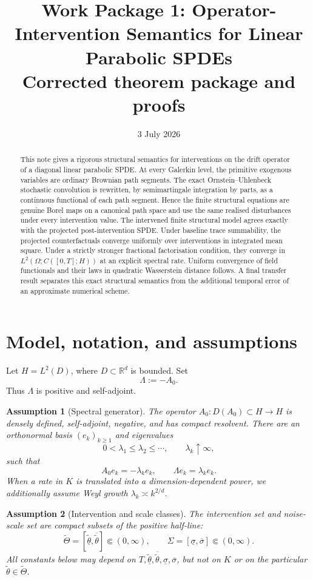\documentclass[11pt]{article}
\title{Work Package 1: Operator-Intervention Semantics for Linear Parabolic SPDEs\\
\large Corrected theorem package and proofs}
\author{}
\date{3 July 2026}
\newtheorem{assumption}{Assumption}[section]
\theoremstyle{remark}
\newcommand{\R}{\mathbb R}
\newcommand{\1}{\mathbf 1}
\newcommand{\ThetaI}{\widetilde\Theta}
\newcommand{\thetamin}{\underline{\widetilde\theta}}
\newcommand{\thetamax}{\overline{\widetilde\theta}}
\newcommand{\sigmamax}{\overline\sigma}
\newcommand{\Lambdaop}{\Lambda}
\begin{document}
\maketitle

\begin{abstract}
This note gives a rigorous structural semantics for interventions on the drift operator of a diagonal linear parabolic SPDE.  At every Galerkin level, the primitive exogenous variables are ordinary Brownian path segments.  The exact Ornstein--Uhlenbeck stochastic convolution is rewritten, by semimartingale integration by parts, as a continuous functional of each path segment.  Hence the finite structural equations are genuine Borel maps on a canonical path space and use the same realised disturbances under every intervention value.  The intervened finite structural model agrees exactly with the projected post-intervention SPDE.  Under baseline trace summability, the projected counterfactuals converge uniformly over interventions in integrated mean square.  Under a strictly stronger fractional factorisation condition, they converge in \(L^2(\Omega;C([0,T];H))\) at an explicit spectral rate.  Uniform convergence of field functionals and their laws in quadratic Wasserstein distance follows.  A final transfer result separates this exact structural semantics from the additional temporal error of an approximate numerical scheme.
\end{abstract}

\section{Model, notation, and assumptions}

Let \(H=L^2(D)\), where \(D\subset\R^d\) is bounded.  Set
\[
  \Lambdaop:=-A_0.
\]
Thus \(\Lambdaop\) is positive and self-adjoint.

\begin{assumption}[Spectral generator]\label{ass:spectral}
The operator \(A_0:D(A_0)\subset H\to H\) is densely defined, self-adjoint, negative, and has compact resolvent.  There are an orthonormal basis \((e_k)_{k\ge1}\) and eigenvalues
\[
  0<\lambda_1\le \lambda_2\le\cdots,\qquad \lambda_k\uparrow\infty,
\]
such that
\[
  A_0e_k=-\lambda_ke_k,
  \qquad
  \Lambdaop e_k=\lambda_ke_k.
\]
When a rate in \(K\) is translated into a dimension-dependent power, we additionally assume Weyl growth \(\lambda_k\asymp k^{2/d}\).
\end{assumption}

\begin{assumption}[Intervention and scale classes]\label{ass:parameters}
The intervention set and noise-scale set are compact subsets of the positive half-line:
\[
  \ThetaI=[\thetamin,\thetamax]\Subset(0,\infty),
  \qquad
  \Sigma=[\underline\sigma,\sigmamax]\Subset(0,\infty).
\]
All constants below may depend on \(T,\thetamin,\thetamax,\underline\sigma,\sigmamax\), but not on \(K\) or on the particular \(\widetilde\theta\in\ThetaI\).
\end{assumption}
\end{document}
